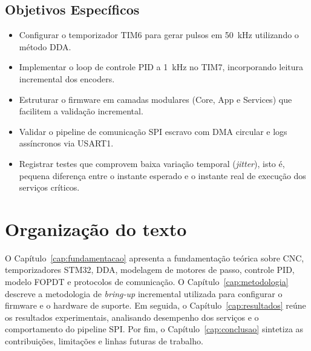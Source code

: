 \subsection{Objetivos Específicos}

\begin{itemize}
    \item Configurar o temporizador TIM6 para gerar pulsos em
          \SI{50}{\kilo\hertz} utilizando o método DDA.
    \item Implementar o loop de controle PID a \SI{1}{\kilo\hertz}
          no TIM7, incorporando leitura incremental dos encoders.
    \item Estruturar o firmware em camadas modulares (Core, App e
          Services) que facilitem a validação incremental.
    \item Validar o pipeline de comunicação SPI escravo com DMA circular
          e logs assíncronos via USART1.
    \item Registrar testes que comprovem baixa variação temporal
          (\emph{jitter}), isto é, pequena diferença entre o instante
          esperado e o instante real de execução dos serviços críticos.
\end{itemize}

\section{Organização do texto}\label{sec:organizacao}

O Capítulo~\ref{cap:fundamentacao} apresenta a fundamentação teórica
sobre CNC, temporizadores STM32, DDA, modelagem de motores de passo,
controle PID, modelo FOPDT e protocolos de comunicação. O
Capítulo~\ref{cap:metodologia} descreve a metodologia de \emph{bring-up}
incremental utilizada para configurar o firmware e o hardware de suporte.
Em seguida, o Capítulo~\ref{cap:resultados}
reúne os resultados experimentais, analisando desempenho dos serviços e
o comportamento do pipeline SPI. Por fim, o
Capítulo~\ref{cap:conclusao} sintetiza as contribuições, limitações e
linhas futuras de trabalho.
